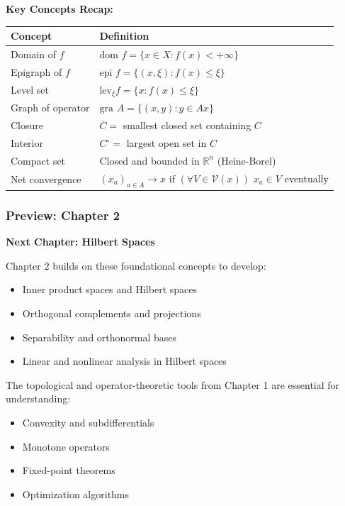 \documentclass[aspectratio=169,10pt]{beamer}
\begin{document}
\begin{frame}[allowframebreaks]
\framebreak

\textbf{Key Concepts Recap:}

\begin{table}[h]
\tiny
\begin{tabular}{|l|l|}
\hline
\textbf{Concept} & \textbf{Definition} \\
\hline
Domain of $f$ & $\text{dom } f = \{x \in X : f(x) < +\infty\}$ \\
Epigraph of $f$ & $\text{epi } f = \{(x, \xi) : f(x) \leq \xi\}$ \\
Level set & $\text{lev}_\xi f = \{x : f(x) \leq \xi\}$ \\
Graph of operator & $\text{gra } A = \{(x, y) : y \in Ax\}$ \\
Closure & $\overline{C} =$ smallest closed set containing $C$ \\
Interior & $C^\circ =$ largest open set in $C$ \\
Compact set & Closed and bounded in $\mathbb{R}^n$ (Heine-Borel) \\
Net convergence & $(x_a)_{a \in A} \to x$ if $(\forall V \in \mathcal{V}(x))$ $x_a \in V$ eventually \\
\hline
\end{tabular}
\end{table}

\end{frame}

\begin{frame}
\frametitle{Preview: Chapter 2}

\textbf{Next Chapter: Hilbert Spaces}

Chapter 2 builds on these foundational concepts to develop:
\begin{itemize}
\item Inner product spaces and Hilbert spaces
\item Orthogonal complements and projections
\item Separability and orthonormal bases
\item Linear and nonlinear analysis in Hilbert spaces
\end{itemize}

\vspace{1cm}

The topological and operator-theoretic tools from Chapter 1 are essential for understanding:
\begin{itemize}
\item Convexity and subdifferentials
\item Monotone operators
\item Fixed-point theorems
\item Optimization algorithms
\end{itemize}

\end{frame}
\end{document}
